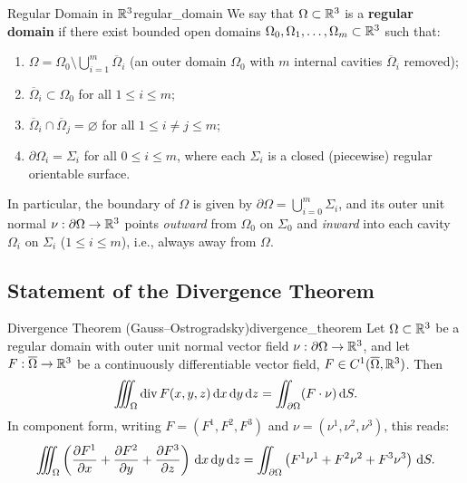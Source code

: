 \begin{definition}{Regular Domain in $\mathbb{R}^3$}{regular_domain}
We say that $\Omega \subset \mathbb{R}^3$ is a \textbf{regular domain} if there exist bounded open domains $\Omega_0, \Omega_1, \dots, \Omega_m \subset \mathbb{R}^3$ such that:
\begin{enumerate}
    \item $\Omega = \Omega_0 \setminus \bigcup_{i=1}^{m} \overline{\Omega}_i$ (an outer domain $\Omega_0$ with $m$ internal cavities $\overline{\Omega}_i$ removed);
    \item $\overline{\Omega}_i \subset \Omega_0$ for all $1 \le i \le m$;
    \item $\overline{\Omega}_i \cap \overline{\Omega}_j = \varnothing$ for all $1 \le i \neq j \le m$;
    \item $\partial\Omega_i = \Sigma_i$ for all $0 \le i \le m$, where each $\Sigma_i$ is a closed (piecewise) regular orientable surface.
\end{enumerate}
In particular, the boundary of $\Omega$ is given by $\partial\Omega = \bigcup_{i=0}^{m} \Sigma_i$, and its outer unit normal $\nu : \partial\Omega \to \mathbb{R}^3$ points \emph{outward} from $\Omega_0$ on $\Sigma_0$ and \emph{inward} into each cavity $\Omega_i$ on $\Sigma_i$ ($1 \le i \le m$), i.e., always away from $\Omega$.
\end{definition}

\subsection{Statement of the Divergence Theorem}

\begin{theoreme}{Divergence Theorem (Gauss--Ostrogradsky)}{divergence_theorem}
Let $\Omega \subset \mathbb{R}^3$ be a regular domain with outer unit normal vector field $\nu : \partial\Omega \to \mathbb{R}^3$, and let $F : \overline{\Omega} \to \mathbb{R}^3$ be a continuously differentiable vector field, $F \in C^1(\overline{\Omega}, \mathbb{R}^3)$. Then
\[
    \iiint_{\Omega} \operatorname{div} F(x,y,z) \,\mathrm{d}x\,\mathrm{d}y\,\mathrm{d}z = \iint_{\partial\Omega} (F \cdot \nu) \,\mathrm{d}S.
\]
In component form, writing $F = (F^1, F^2, F^3)$ and $\nu = (\nu^1, \nu^2, \nu^3)$, this reads:
\[
    \iiint_{\Omega} \left( \pdv{F^1}{x} + \pdv{F^2}{y} + \pdv{F^3}{z} \right) \dx\dy\dz = \iint_{\partial\Omega} \left( F^1 \nu^1 + F^2 \nu^2 + F^3 \nu^3 \right) \dS.
\]
\end{theoreme}

